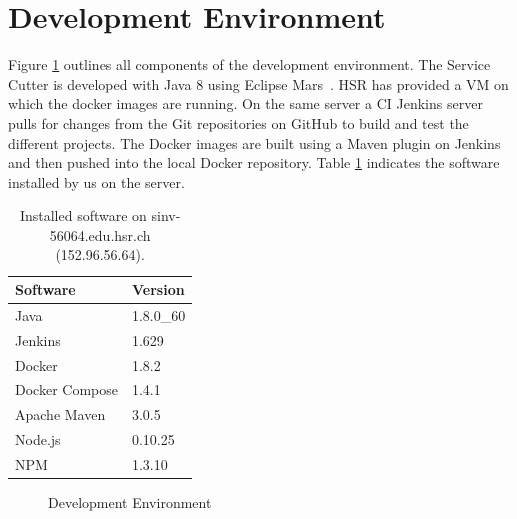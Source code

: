 \section{Development Environment}

Figure \ref{fig:devenvironment} outlines all components of the development environment. The Service Cutter is developed with Java 8 using Eclipse Mars~\cite{eclipsemars}. \gls{HSR} has provided a \gls{VM} on which the \gls{docker} images are running. On the same server a \gls{CI} Jenkins server pulls for changes from the Git repositories on GitHub to build and test the different projects. The Docker images are built using a Maven plugin on Jenkins and then pushed into the local Docker repository. Table \ref{tab:vm} indicates the software installed by us on the server.


\begin{table}[H]
\begin{center}
\begin{tabular}
{|p{100pt} p{80pt}|}
\hline \textbf{Software} & \textbf{Version} \\ 
\hline Java & 1.8.0\_60 \\ 
\hline Jenkins & 1.629 \\ 
\hline Docker & 1.8.2 \\ 
\hline Docker Compose & 1.4.1 \\
\hline Apache Maven & 3.0.5 \\
\hline Node.js & 0.10.25 \\
\hline NPM & 1.3.10 \\
\hline 
\end{tabular} 
\caption{Installed software on sinv-56064.edu.hsr.ch (152.96.56.64).}
\label{tab:vm}
\end{center}
\end{table}

\begin{figure}[H]
	\caption{Development Environment}
	\label{fig:devenvironment}
\end{figure}
